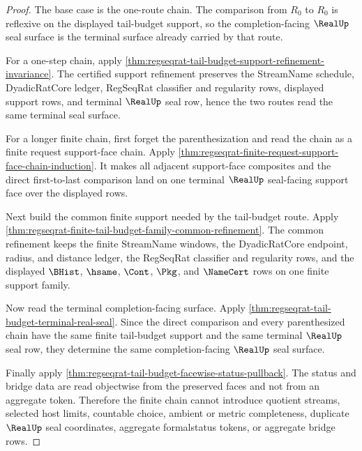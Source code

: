\begin{proof}
The base case is the one-route chain. The comparison from $R_0$ to $R_0$ is
reflexive on the displayed tail-budget support, so the completion-facing
$\RealUp$ seal surface is the terminal surface already carried by that route.

For a one-step chain, apply
\autoref{thm:regseqrat-tail-budget-support-refinement-invariance}. The
certified support refinement preserves the StreamName schedule, DyadicRatCore
ledger, RegSeqRat classifier and regularity rows, displayed support rows, and
terminal $\RealUp$ seal row, hence the two routes read the same terminal seal
surface.

For a longer finite chain, first forget the parenthesization and read the chain
as a finite request support-face chain. Apply
\autoref{thm:regseqrat-finite-request-support-face-chain-induction}. It makes
all adjacent support-face composites and the direct first-to-last comparison
land on one terminal $\RealUp$ seal-facing support face over the displayed
rows.

Next build the common finite support needed by the tail-budget route. Apply
\autoref{thm:regseqrat-finite-tail-budget-family-common-refinement}. The common
refinement keeps the finite StreamName windows, the DyadicRatCore endpoint,
radius, and distance ledger, the RegSeqRat classifier and regularity rows, and
the displayed $\BHist$, $\hsame$, $\Cont$, $\Pkg$, and $\NameCert$ rows on one
finite support family.

Now read the terminal completion-facing surface. Apply
\autoref{thm:regseqrat-tail-budget-terminal-real-seal}. Since the direct
comparison and every parenthesized chain have the same finite tail-budget
support and the same terminal $\RealUp$ seal row, they determine the same
completion-facing $\RealUp$ seal surface.

Finally apply \autoref{thm:regseqrat-tail-budget-facewise-status-pullback}. The
status and bridge data are read objectwise from the preserved faces and not
from an aggregate token. Therefore the finite chain cannot introduce quotient
streams, selected host limits, countable choice, ambient or metric
completeness, duplicate $\RealUp$ seal coordinates, aggregate formalstatus
tokens, or aggregate bridge rows.
\end{proof}
